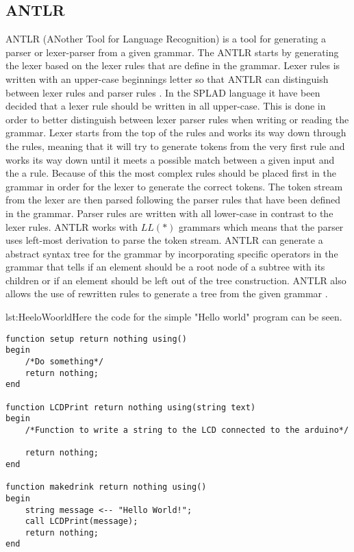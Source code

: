 \subsection{ANTLR}
ANTLR (ANother Tool for Language Recognition) is a tool for generating a parser or lexer-parser from a given grammar. The ANTLR starts by generating the lexer based on the lexer rules that are define in the grammar. Lexer rules is written with an upper-case beginnings letter so that ANTLR can distinguish between lexer rules and parser rules \citep{ANTLRLexer}.
In the SPLAD language it have been decided that a lexer rule should be written in all upper-case. This is done in order to better distinguish between lexer parser rules when writing or reading the grammar. Lexer starts from the top of the rules and works its way down through the rules, meaning that it will try to generate tokens from the very first rule and works its way down until it meets a possible match between a given input and the a rule. Because of this the most complex rules should be placed first in the grammar in order for the lexer to generate the correct tokens. 
The token stream from the lexer are then parsed following the parser rules that have been defined in the grammar. Parser rules are written with all lower-case in contrast to the lexer rules. ANTLR works with $LL(*)$ grammars which means that the parser uses left-most derivation to parse the token stream. ANTLR can generate a abstract syntax tree for the grammar by incorporating specific operators in the grammar that tells if an element should be a root node of a subtree with its children or if an element should be left out of the tree construction. ANTLR also allows the use of rewritten rules to generate a tree from the given grammar \citep{ANTLRTreeCon}.

\begin{code}{lst:HeeloWoorld}{Here the code for the simple "Hello world" program can be seen.}
\begin{lstlisting}
function setup return nothing using()
begin
	/*Do something*/
	return nothing;
end

function LCDPrint return nothing using(string text)
begin
	/*Function to write a string to the LCD connected to the arduino*/
		
	return nothing;
end

function makedrink return nothing using()
begin
	string message <-- "Hello World!";
	call LCDPrint(message);
	return nothing;
end
\end{lstlisting}
\end{code}

